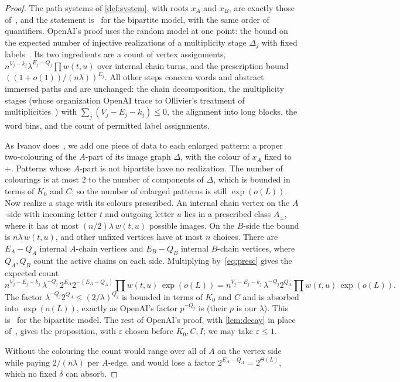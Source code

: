 \documentclass[11pt]{article}
\theoremstyle{definition}
\theoremstyle{plain}
\newcommand{\eps}{\varepsilon}
\begin{document}
\begin{proof}
The path systems of \cref{def:system}, with roots $x_A$ and $x_B$, are exactly those of~\cite[\S3]{OAI196}, and the statement is~\cite[Prop.~3.1]{OAI196} for the bipartite model, with the same order of quantifiers. OpenAI's proof uses the random model at one point: the bound on the expected number of injective realizations of a multiplicity stage $\Delta_j$ with fixed labels~\cite[(3.10)]{OAI196}. Its two ingredients are a count of vertex assignments, $n^{V_j-k_j}\lambda^{E_j-Q_j}\prod w(t,u)$ over internal chain turns, and the prescription bound $((1+o(1))/(n\lambda))^{E_j}$. All other steps concern words and abstract immersed paths and are unchanged: the chain decomposition, the multiplicity stages (whose organization OpenAI trace to Ollivier's treatment of multiplicities~\cite{Ollivier2005}) with $\sum_j(V_j-E_j-k_j)\le0$, the alignment into long blocks, the word bins, and the count of permitted label assignments.

As Ivanov does~\cite[\S6.1]{Ivanov2026}, we add one piece of data to each enlarged pattern: a proper two-colouring of the $A$-part of its image graph $\Delta$, with the colour of $x_A$ fixed to $+$. Patterns whose $A$-part is not bipartite have no realization. The number of colourings is at most $2$ to the number of components of $\Delta$, which is bounded in terms of $K_0$ and $C$; so the number of enlarged patterns is still $\exp(o(L))$. Now realize a stage with its colours prescribed. An internal chain vertex on the $A$-side with incoming letter $t$ and outgoing letter $u$ lies in a prescribed class $A_\pm$, where it has at most $(n/2)\lambda\,w(t,u)$ possible images. On the $B$-side the bound is $n\lambda\,w(t,u)$, and other unfixed vertices have at most $n$ choices. There are $E_A-Q_A$ internal $A$-chain vertices and $E_B-Q_B$ internal $B$-chain vertices, where $Q_A,Q_B$ count the active chains on each side. Multiplying by~\eqref{eq:presc} gives the expected count
\[
n^{V_j-E_j-k_j}\,\lambda^{-Q_j}\,2^{E_A}2^{-(E_A-Q_A)}\prod w(t,u)\,\exp(o(L))=n^{V_j-E_j-k_j}\,\lambda^{-Q_j}2^{Q_A}\prod w(t,u)\,\exp(o(L)).
\]
The factor $\lambda^{-Q_j}2^{Q_A}\le(2/\lambda)^{Q_j}$ is bounded in terms of $K_0$ and $C$ and is absorbed into $\exp(o(L))$, exactly as OpenAI's factor $p^{-Q_j}$ is (their $p$ is our $\lambda$). This is~\cite[(3.10)]{OAI196} for the bipartite model. The rest of OpenAI's proof, with \cref{lem:decay} in place of~\cite[Lemma~2.1]{OAI196}, gives the proposition, with $\eps$ chosen before $K_0,C,I$; we may take $\eps\le1$.

Without the colouring the count would range over all of $A$ on the vertex side while paying $2/(n\lambda)$ per $A$-edge, and would lose a factor $2^{E_A-Q_A}=2^{\Theta(L)}$, which no fixed $\delta$ can absorb.
\end{proof}
\end{document}
